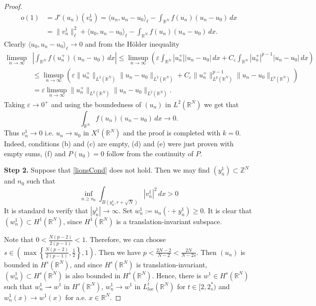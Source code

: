 \documentclass[12pt,leqno,twoside,sort]{amsart}
\newcommand{\R}{\mathbb{R}}
\newcommand{\Z}{\mathbb{Z}}
\newcommand{\weakto}{\rightharpoonup}
\numberwithin{equation}{section}
\begin{document}
\begin{proof}
\begin{align*}
o(1) &= J'(u_n)(v_n^1) = \langle u_n, u_n-u_0 \rangle_\ell - \int_{\R^N} f(u_n)(u_n-u_0) \, dx \\
&= \| v_n^1 \|^2_\ell + \langle u_0, u_n - u_0 \rangle_\ell - \int_{\R^N} f(u_n)(u_n-u_0) \, dx.
\end{align*}
Clearly $\langle u_0, u_n - u_0 \rangle_\ell \to 0$ and from the H\"older inequality
\begin{align*}
\limsup_{n\to \infty} &\left| \int_{\R^N} f(u_n^+)(u_n-u_0) \, dx \right| \leq \limsup_{n\to \infty} \left( \varepsilon \int_{\R^N} |u_n^+| |u_n-u_0| \, dx +  C_\varepsilon \int_{\R^N} |u_n^+|^{p-1} |u_n-u_0| \, dx \right) \\ 
&\leq \limsup_{n\to \infty} \left( \varepsilon \| u_n^+ \|_{L^2 (\R^N)} \|u_n-u_0\|_{L^2 (\R^N)} + C_\varepsilon \| u_n^+ \|_{L^p (\R^N)}^{p-1} \|u_n-u_0\|_{L^p (\R^N)} \right) \\
&= \varepsilon \limsup_{n\to\infty} \| u_n^+ \|_{L^2 (\R^N)} \|u_n-u_0\|_{L^2 (\R^N)}.
\end{align*}
Taking $\varepsilon \to 0^+$ and using the boundedness of $(u_n)$ in $L^2 (\R^N)$ we get that
$$
\int_{\R^N} f(u_n)(u_n-u_0) \, dx \to 0.
$$
Thus $v_n^1\to 0$ i.e. $u_n \to u_0$ in $X^1 (\R^N)$ and the proof is completed with $k = 0$. Indeed, conditions (b) and (c) are empty, (d) and (e) were just proven with empty sums, (f) and $P(u_0)=0$ follow from the continuity of $P$.


\textbf{Step 2.}
Suppose that \eqref{lionsCond} does not hold. Then we may find $(y_n^1) \subset \Z^N$ and $n_0$ such that
$$
\inf_{n \geq n_0} \int_{B(y_n^1, r+\sqrt{N})} |v_n^1|^2 \, dx > 0
$$ 
It is standard to verify that $|y_n^1| \to \infty$. Set $w_n^1 := u_n (\cdot + y_n^1)\geq 0$. It is clear that $(w_n^1) \subset H^1 (\R^N)$, since $H^1 (\R^N)$ is a translation-invariant subspace. 


Note that $0<\frac{N(p-2)}{2(p-1)}<1$. Therefore, we can choose $s\in \left( \max \left\{ \frac{N(p-2)}{2(p-1)}, \frac12 \right\}, 1 \right)$. Then we have $p<\frac{2N-2}{N-2}<\frac{2N}{N-2s}$. Then $(u_n)$ is bounded in $H^s (\R^N)$, and since $H^s (\R^N)$ is translation-invariant, $(w_n^1) \subset H^s (\R^N)$ is also bounded in $H^s (\R^N)$. Hence, there is $w^1 \in H^s (\R^N)$ such that $w_n^1 \weakto w^1$ in $H^s (\R^N)$, $w_n^1 \to w^1$ in $L^t_{loc} (\R^N)$ for $t \in [2,2^*_s)$ and $w_n^1 (x) \to w^1 (x)$ for a.e. $x \in \R^N$. 



\end{proof}
\end{document}
